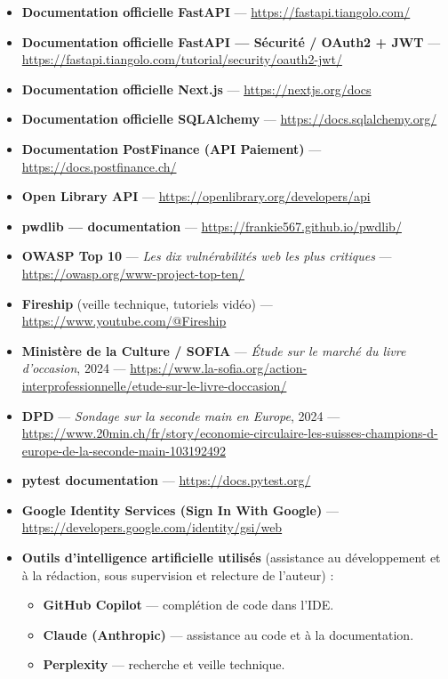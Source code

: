 \documentclass[12pt, a4paper]{report}
\renewcommand{\_}{\origunderscore\allowbreak}
\begin{document}
\begin{itemize}
    \item \textbf{Documentation officielle FastAPI} — \url{https://fastapi.tiangolo.com/}
    \item \textbf{Documentation officielle FastAPI — Sécurité / OAuth2 + JWT} — \url{https://fastapi.tiangolo.com/tutorial/security/oauth2-jwt/}
    \item \textbf{Documentation officielle Next.js} — \url{https://nextjs.org/docs}
    \item \textbf{Documentation officielle SQLAlchemy} — \url{https://docs.sqlalchemy.org/}
    \item \textbf{Documentation PostFinance (API Paiement)} — \url{https://docs.postfinance.ch/}
    \item \textbf{Open Library API} — \url{https://openlibrary.org/developers/api}
    \item \textbf{pwdlib — documentation} — \url{https://frankie567.github.io/pwdlib/}
    \item \textbf{OWASP Top 10} — \textit{Les dix vulnérabilités web les plus critiques} — \url{https://owasp.org/www-project-top-ten/}
    \item \textbf{Fireship} (veille technique, tutoriels vidéo) — \url{https://www.youtube.com/@Fireship}
    \item \textbf{Ministère de la Culture / SOFIA} — \textit{Étude sur le marché du livre d'occasion}, 2024 — \url{https://www.la-sofia.org/action-interprofessionnelle/etude-sur-le-livre-doccasion/}
    \item \textbf{DPD} — \textit{Sondage sur la seconde main en Europe}, 2024 — \url{https://www.20min.ch/fr/story/economie-circulaire-les-suisses-champions-d-europe-de-la-seconde-main-103192492}
    \item \textbf{pytest documentation} — \url{https://docs.pytest.org/}
    \item \textbf{Google Identity Services (Sign In With Google)} — \url{https://developers.google.com/identity/gsi/web}
    \item \textbf{Outils d'intelligence artificielle utilisés} (assistance au développement et à la rédaction, sous supervision et relecture de l'auteur) :
    \begin{itemize}
        \item \textbf{GitHub Copilot} — complétion de code dans l'IDE.
        \item \textbf{Claude (Anthropic)} — assistance au code et à la documentation.
        \item \textbf{Perplexity} — recherche et veille technique.
    \end{itemize}
\end{itemize}
\end{document}
